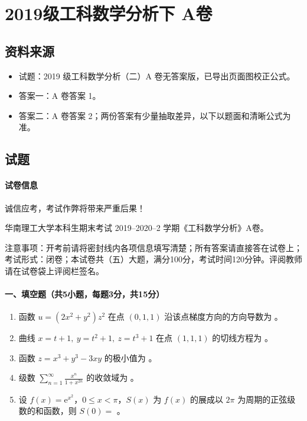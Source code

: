 \section{2019级工科数学分析下 A卷}

\subsection{资料来源}
\begin{itemize}
  \item 试题：2019 级工科数学分析（二）A 卷无答案版，已导出页面图校正公式。
  \item 答案一：A 卷答案 1。
  \item 答案二：A 卷答案 2；两份答案有少量抽取差异，以下以题面和清晰公式为准。
\end{itemize}

\subsection{试题}

\paragraph*{试卷信息}
诚信应考，考试作弊将带来严重后果！

华南理工大学本科生期末考试 2019--2020--2 学期《工科数学分析》A卷。

注意事项：开考前请将密封线内各项信息填写清楚；所有答案请直接答在试卷上；考试形式：闭卷；本试卷共（五）大题，满分100分，考试时间120分钟。评阅教师请在试卷袋上评阅栏签名。

\paragraph*{一、填空题（共5小题，每题3分，共15分）}
\begin{enumerate}
  \item 函数 \(u=(2x^2+y^2)z^2\) 在点 \((0,1,1)\) 沿该点梯度方向的方向导数为 \underline{\hspace{5cm}}。
  \item 曲线 \(x=t+1,\ y=t^2+1,\ z=t^3+1\) 在点 \((1,1,1)\) 的切线方程为 \underline{\hspace{5cm}}。
  \item 函数 \(z=x^3+y^3-3xy\) 的极小值为 \underline{\hspace{5cm}}。
  \item 级数 \(\displaystyle \sum_{n=1}^{\infty}\frac{x^n}{1+x^{2n}}\) 的收敛域为 \underline{\hspace{5cm}}。
  \item 设 \(f(x)=\mathrm{e}^{x^2}\)，\(0\le x<\pi\)，\(S(x)\) 为 \(f(x)\) 的展成以 \(2\pi\) 为周期的正弦级数的和函数，则 \(S(0)=\) \underline{\hspace{5cm}}。
\end{enumerate}

